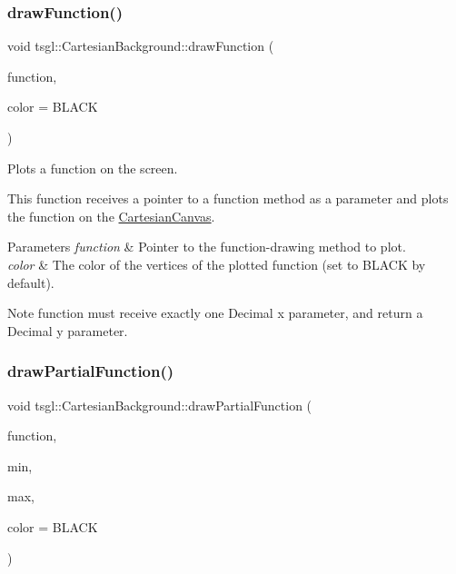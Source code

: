 \subsubsection{\texorpdfstring{draw\+Function()}{drawFunction()}\hspace{0.1cm}{\footnotesize\ttfamily [2/2]}}
{\footnotesize\ttfamily void tsgl\+::\+Cartesian\+Background\+::draw\+Function (\begin{DoxyParamCaption}\item[{function\+Pointer \&}]{function,  }\item[{\hyperlink{structtsgl_1_1_color_float}{Color\+Float}}]{color = {\ttfamily BLACK} }\end{DoxyParamCaption})}



Plots a function on the screen. 

This function receives a pointer to a function method as a parameter and plots the function on the \hyperlink{classtsgl_1_1_cartesian_canvas}{Cartesian\+Canvas}. 
\begin{DoxyParams}{Parameters}
{\em function} & Pointer to the function-\/drawing method to plot. \\
\hline
{\em color} & The color of the vertices of the plotted function (set to B\+L\+A\+CK by default). \\
\hline
\end{DoxyParams}
\begin{DoxyNote}{Note}
{\ttfamily function} must receive exactly one Decimal x parameter, and return a Decimal y parameter. 
\end{DoxyNote}
\mbox{\label{classtsgl_1_1_cartesian_background_a315ee79b872d8fc612749795f4bbb6d9}} 
\subsubsection{\texorpdfstring{draw\+Partial\+Function()}{drawPartialFunction()}}
{\footnotesize\ttfamily void tsgl\+::\+Cartesian\+Background\+::draw\+Partial\+Function (\begin{DoxyParamCaption}\item[{function\+Pointer \&}]{function,  }\item[{Decimal}]{min,  }\item[{Decimal}]{max,  }\item[{\hyperlink{structtsgl_1_1_color_float}{Color\+Float}}]{color = {\ttfamily BLACK} }\end{DoxyParamCaption})}



